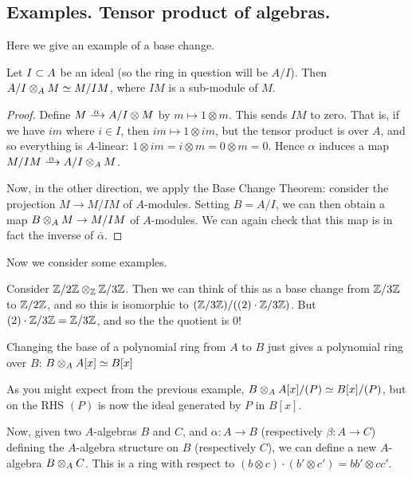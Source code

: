 \subsection{Examples. Tensor product of algebras.}
Here we give an example of a base change.
\begin{prop}
Let $I \subset A$ be an ideal (so the ring in question will be $A / I$). Then $A / I \otimes_{A} M \simeq M / IM$, where $IM$ is a sub-module of $M$.
\end{prop}
\begin{proof}
Define $M \namedmap{\alpha} A/I \otimes M$ by $m \mapsto 1 \otimes m$. This sends $IM$ to zero. 
That is, if we have $im$ where $i \in I$, then $im \mapsto 1 \otimes im$, but the tensor product is over $A$, and so everything is $A$-linear: $1 \otimes im = i \otimes m = 0 \otimes m = 0$.
Hence $\alpha$ induces a map $M / IM \namedmap{\bar\alpha} A/I \tensor{A} M$.

Now, in the other direction, we apply the Base Change Theorem: consider the projection $M \to M / IM$ of $A$-modules.
Setting $B = A/I$, we can then obtain a map $B \otimes_{A} M \to M / IM$ of $A$-modules.
We can again check that this map is in fact the inverse of $\bar\alpha$.
\end{proof}

Now we consider some examples.

\begin{ex}
Consider $\mathbb{Z} / 2\mathbb{Z} \otimes_{\mathbb{Z}} \mathbb{Z} / 3\mathbb{Z}$. 
Then we can think of this as a base change from $\mathbb{Z}/3\mathbb{Z}$ to $\mathbb{Z}/2\mathbb{Z}$, and so this is isomorphic to $(\mathbb{Z} / 3\mathbb{Z}) / ((2) \cdot \mathbb{Z} / 3\mathbb{Z})$. 
But $(2)\cdot \mathbb{Z} / 3\mathbb{Z} = \mathbb{Z} / 3\mathbb{Z}$, and so the the quotient is $0$!
\end{ex}
\begin{ex}
Changing the base of a polynomial ring from $A$ to $B$ just gives a polynomial ring over $B$: $B \otimes_{A} A[x] \simeq B[x]$
\end{ex}
\begin{ex}
As you might expect from the previous example, $B \otimes_{A} A[x] / (P) \simeq B[x] / (P)$, but on the RHS $(P)$ is now the ideal generated by $P$ in $B[x]$.
\end{ex}

Now, given two $A$-algebras $B$ and $C$, and $\alpha: A \to B$ (respectively $\beta: A \to C$) defining the $A$-algebra structure on $B$ (respectively $C$), we can define a new $A$-algebra $B \otimes_{A} C$.
This is a ring with respect to $(b \otimes c) \cdot (b' \otimes c') = bb' \otimes cc'$.

